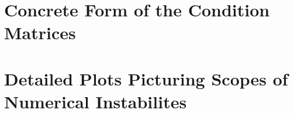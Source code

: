 \section{Concrete Form of the Condition Matrices}
\section{Detailed Plots Picturing Scopes of Numerical Instabilites}